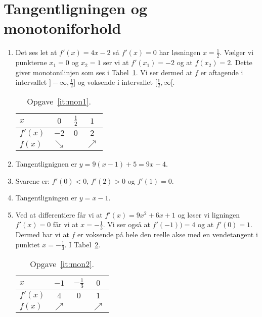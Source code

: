 \newpage
\section{Tangentligningen og monotoniforhold}
\begin{enumerate}
	
	\item\label{it:mon1} Det ses let at $f'(x)=4x-2$ så $f'(x)=0$ har løsningen $x=\frac{1}{2}$. Vælger vi punkterne $x_1=0$ og $x_2=1$ ser vi at $f'(x_1)=-2$ og at $f(x_2)=2$. Dette giver monotonilinjen som ses i Tabel~\ref{fig:mon1}. Vi ser dermed at $f$ er aftagende i intervallet $ ]-\infty,\frac{1}{2}] $ og voksende i intervallet $[\frac{1}{2},\infty[$.
	
	\begin{table}[h!]
		\centering
		\begin{tabular}{@{}l  c c c@{}}
			$x$      & $0$ 		 & $\frac{1}{2}$	& $1$			\\ \toprule
			$f'(x)$  & $-2$		 &     $0$ 		 	& $2$			\\ \midrule
			$f(x)$   & $\searrow$&					& $\nearrow$	\\ \bottomrule  
		\end{tabular}
		\caption{Opgave~\ref{it:mon1}.}
		\label{fig:mon1}
	\end{table}
	
	
	\item Tangentlignignen er $y=9(x-1)+5=9x-4$.
	
	\item Svarene er: $f'(0)<0$, $f'(2)>0$ og $f'(1)=0$.
	
	
	\item Tangentligningen er $y=x-1$.
	
	\item \label{it:mon2} Ved at differentiere får vi at $f'(x) = 9x^2+6x+1$ og løser vi ligningen $f'(x)=0$ får vi at $x=-\frac{1}{3}$. Vi ser også at $f'(-1))=4$ og at $f'(0)=1$. Dermed har vi at $f$ er voksende på hele den reelle akse med en vendetangent i punktet $x=-\frac{1}{3}$. I Tabel~\ref{fig:mon2}.
	\begin{table}[h!]
	\centering
	\begin{tabular}{@{}l  c c c@{}}
		$x$      & $-1$ 	 & $-\frac{1}{3}$	& $0$			\\ \toprule
		$f'(x)$  & $4$		 &     $0$ 		 	& $1$			\\ \midrule
		$f(x)$   & $\nearrow$&					& $\nearrow$	\\ \bottomrule  
	\end{tabular}
	\caption{Opgave~\ref{it:mon2}.}
	\label{fig:mon2}
\end{table}



\end{enumerate}
